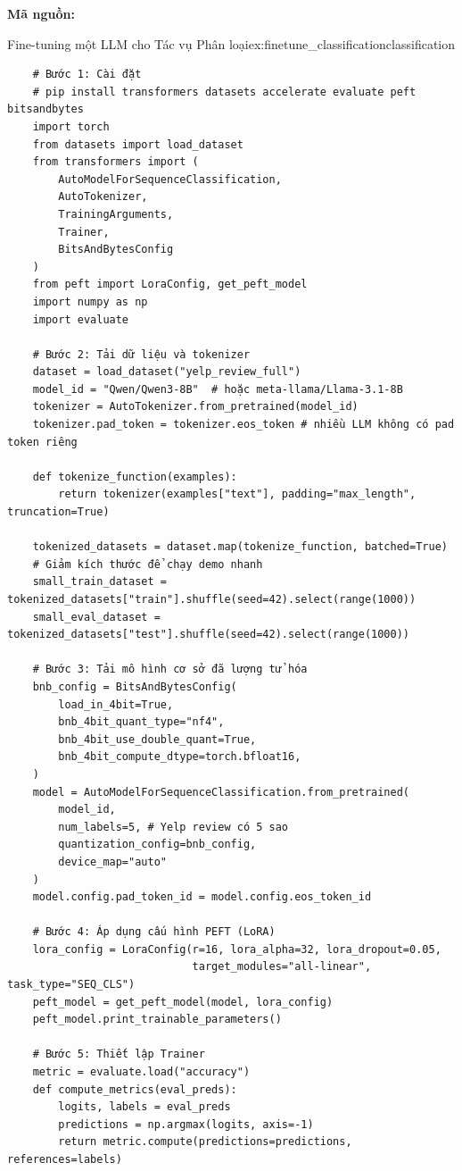 \textbf{Mã nguồn:}

\begin{example}{Fine-tuning một LLM cho Tác vụ Phân loại}{ex:finetune_classificationclassification}
    \begin{verbatim}
    # Bước 1: Cài đặt
    # pip install transformers datasets accelerate evaluate peft bitsandbytes
    import torch
    from datasets import load_dataset
    from transformers import (
        AutoModelForSequenceClassification,
        AutoTokenizer,
        TrainingArguments,
        Trainer,
        BitsAndBytesConfig
    )
    from peft import LoraConfig, get_peft_model
    import numpy as np
    import evaluate
    
    # Bước 2: Tải dữ liệu và tokenizer
    dataset = load_dataset("yelp_review_full")
    model_id = "Qwen/Qwen3-8B"  # hoặc meta-llama/Llama-3.1-8B
    tokenizer = AutoTokenizer.from_pretrained(model_id)
    tokenizer.pad_token = tokenizer.eos_token # nhiều LLM không có pad token riêng
    
    def tokenize_function(examples):
        return tokenizer(examples["text"], padding="max_length", truncation=True)
    
    tokenized_datasets = dataset.map(tokenize_function, batched=True)
    # Giảm kích thước để chạy demo nhanh
    small_train_dataset = tokenized_datasets["train"].shuffle(seed=42).select(range(1000))
    small_eval_dataset = tokenized_datasets["test"].shuffle(seed=42).select(range(1000))
    
    # Bước 3: Tải mô hình cơ sở đã lượng tử hóa
    bnb_config = BitsAndBytesConfig(
        load_in_4bit=True,
        bnb_4bit_quant_type="nf4",
        bnb_4bit_use_double_quant=True,
        bnb_4bit_compute_dtype=torch.bfloat16,
    )
    model = AutoModelForSequenceClassification.from_pretrained(
        model_id,
        num_labels=5, # Yelp review có 5 sao
        quantization_config=bnb_config,
        device_map="auto"
    )
    model.config.pad_token_id = model.config.eos_token_id
    
    # Bước 4: Áp dụng cấu hình PEFT (LoRA)
    lora_config = LoraConfig(r=16, lora_alpha=32, lora_dropout=0.05,
                             target_modules="all-linear", task_type="SEQ_CLS")
    peft_model = get_peft_model(model, lora_config)
    peft_model.print_trainable_parameters()
    
    # Bước 5: Thiết lập Trainer
    metric = evaluate.load("accuracy")
    def compute_metrics(eval_preds):
        logits, labels = eval_preds
        predictions = np.argmax(logits, axis=-1)
        return metric.compute(predictions=predictions, references=labels)
    

\end{verbatim}
\end{example}
